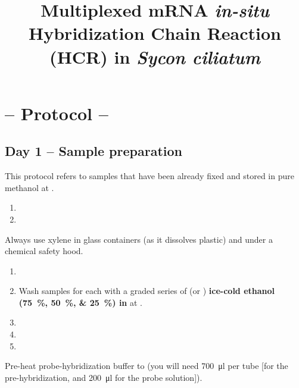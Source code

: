 \documentclass[12pt]{report}
\title{\vspace{-3em} Multiplexed mRNA \textit{in-situ} Hybridization Chain Reaction (HCR) in \emph{Sycon ciliatum}}
\begin{document}

\maketitle
\thispagestyle{plain}

\section*{-- Protocol --}

\subsection*{Day 1 -- Sample preparation}

\alert{This protocol refers to samples that have been already fixed and stored in pure methanol at \minustwenty.}

\begin{enumerate}[series = steps]
  \item {}
  \item {}
\end{enumerate}

\bigskip\alert{Always use xylene in glass containers (as it dissolves plastic) and under a chemical safety hood.}

\begin{enumerate}[resume = steps]
  \item {}
  \item Wash samples for \ul{\quarter{}} each with a graded series of \fivehunmicrol{} (or \onemil) \textbf{ice-cold ethanol (\qtylist{75;50;25}{\percent}) in \hs{}} at \fourdegree.
  \item {}
  \item {}
  \item {}
\end{enumerate}

\bigskip\alert{Pre-heat probe-hybridization buffer to \thirtysevendegree{} (you will need \qty{700}{\ul} per tube [\fivehunmicrol for the pre-hybridization, and \qty{200}{\ul} for the probe solution]).}
\end{document}
